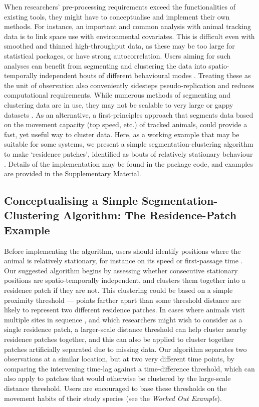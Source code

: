 When researchers' pre-processing requirements exceed the functionalities of existing tools, they might have to conceptualise and implement their own methods.
For instance, an important and common analysis with animal tracking data is to link space use with environmental covariates.
This is difficult even with smoothed and thinned high-throughput data, as these may be too large for statistical packages, or have strong autocorrelation.
Users aiming for such analyses can benefit from segmenting and clustering the data into spatio-temporally independent bouts of different behavioural modes \citep{patin2020a}.
Treating these as the unit of observation also conveniently sidesteps pseudo-replication and reduces computational requirements.
While numerous methods of segmenting and clustering data are in use, they may not be scalable to very large or gappy datasets \citep{patin2020a, langrock2012, michelot2016}.
As an alternative, a first-principles approach that segments data based on the movement capacity (top speed, etc.) of tracked animals, could provide a fast, yet useful way to cluster data.
Here, as a working example that may be suitable for some systems, we present a simple segmentation-clustering algorithm to make `residence patches', identified as bouts of relatively stationary behaviour \citep[][]{barraquand2008,bijleveld2016,oudman2018}.
Details of the implementation may be found in the package code, and examples are provided in the Supplementary Material.

\subsection*{Conceptualising a Simple Segmentation-Clustering Algorithm: The Residence-Patch Example}

Before implementing the algorithm, users should identify positions where the animal is relatively stationary, for instance on its speed or first-passage time \citep{bracis2018,barraquand2008}.
Our suggested algorithm begins by assessing whether consecutive stationary positions are spatio-temporally independent, and clusters them together into a residence patch if they are not.
This clustering could be based on a simple proximity threshold --- points farther apart than some threshold distance are likely to represent two different residence patches.
In cases where animals visit multiple sites in sequence \citep[such as traplining:][]{thomson1997}, and which researchers might wish to consider as a single residence patch, a larger-scale distance threshold can help cluster nearby residence patches together, and this can also be applied to cluster together patches artificially separated due to missing data.
Our algorithm separates two observations at a similar location, but at two very different time points, by comparing the intervening time-lag against a time-difference threshold, which can also apply to patches that would otherwise be clustered by the large-scale distance threshold.
Users are encouraged to base these thresholds on the movement habits of their study species (see the \textit{Worked Out Example}).

